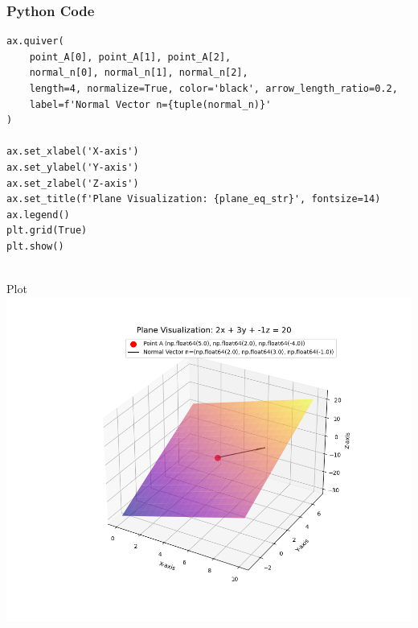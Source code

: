 \documentclass{beamer}
\begin{document}
\begin{frame}[fragile]
    \frametitle{Python Code}
    \begin{lstlisting}
ax.quiver(
    point_A[0], point_A[1], point_A[2],
    normal_n[0], normal_n[1], normal_n[2],
    length=4, normalize=True, color='black', arrow_length_ratio=0.2,
    label=f'Normal Vector n={tuple(normal_n)}'
)

ax.set_xlabel('X-axis')
ax.set_ylabel('Y-axis')
ax.set_zlabel('Z-axis')
ax.set_title(f'Plane Visualization: {plane_eq_str}', fontsize=14)
ax.legend()
plt.grid(True)
plt.show()
   
    \end{lstlisting}
\end{frame}
\begin{frame}{Plot}
    \centering
    \includegraphics[width=\columnwidth, height=0.9\textheight, keepaspectratio]{figs/fig3.png}     
\end{frame}
\end{document}
